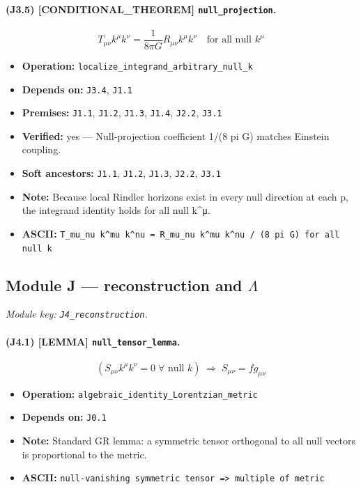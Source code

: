 \documentclass[11pt,a4paper]{article}
\theoremstyle{remark}\newtheorem*{caution}{Caution}
\newcommand{\tagbox}[1]{\textsc{[#1]}}
\begin{document}
\paragraph{(J3.5) \tagbox{CONDITIONAL\_THEOREM} \texttt{null\_projection}.}
\begin{equation}
T_{\mu\nu}k^\mu k^\nu=\frac{1}{8\pi G}R_{\mu\nu}k^\mu k^\nu\quad\text{for all null }k^\mu
\tag{J3.5}
\end{equation}
\begin{itemize}\setlength{\itemsep}{0.12em}
\item \textbf{Operation:} \texttt{localize\_integrand\_arbitrary\_null\_k}
\item \textbf{Depends on:} \texttt{J3.4}, \texttt{J1.1}
\item \textbf{Premises:} \texttt{J1.1}, \texttt{J1.2}, \texttt{J1.3}, \texttt{J1.4}, \texttt{J2.2}, \texttt{J3.1}
\item \textbf{Verified:} yes --- Null-projection coefficient 1/(8 pi G) matches Einstein coupling.
\item \textbf{Soft ancestors:} \texttt{J1.1}, \texttt{J1.2}, \texttt{J1.3}, \texttt{J2.2}, \texttt{J3.1}
\item \textbf{Note:} Because local Rindler horizons exist in every null direction at each p, the integrand identity holds for all null k^μ.
\item \textbf{ASCII:} \texttt{T\_mu\_nu k^mu k^nu = R\_mu\_nu k^mu k^nu / (8 pi G) for all null k}
\end{itemize}
\subsection{Module J --- reconstruction and $\Lambda$}
\textit{Module key: \texttt{J4\_reconstruction}.}
\paragraph{(J4.1) \tagbox{LEMMA} \texttt{null\_tensor\_lemma}.}
\begin{equation}
(S_{\mu\nu}k^\mu k^\nu=0\;\forall\text{ null }k)\;\Rightarrow\;S_{\mu\nu}=f g_{\mu\nu}
\tag{J4.1}
\end{equation}
\begin{itemize}\setlength{\itemsep}{0.12em}
\item \textbf{Operation:} \texttt{algebraic\_identity\_Lorentzian\_metric}
\item \textbf{Depends on:} \texttt{J0.1}
\item \textbf{Note:} Standard GR lemma: a symmetric tensor orthogonal to all null vectors is proportional to the metric.
\item \textbf{ASCII:} \texttt{null-vanishing symmetric tensor => multiple of metric}
\end{itemize}
\end{document}
